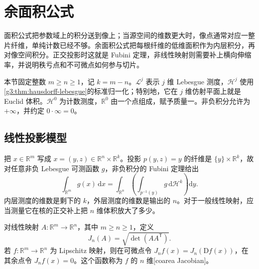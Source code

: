 
% 
% 

\section{余面积公式}
\label{g3:sec:2004}

面积公式把参数域上的积分送到像上；当源空间的维数更大时，像点通常对应一整片纤维，单纯计数已经不够。余面积公式把每根纤维的低维面积作为内层积分，再对像空间积分。正交投影时这就是 Fubini 定理，非线性映射则需要补上横向伸缩率，并说明秩亏点和不可微点如何参与切片。

\ProseParagraphBreak

本节固定整数 \(m\ge n\ge1\)，记 \(k=m-n\)。\(\mathcal L^j\) 表示 \(j\) 维 Lebesgue 测度，\(\mathcal H^j\) 使用\cref{g3:thm:hausdorff-lebesgue}的标准归一化；特别地，它在 \(j\) 维仿射平面上就是 Euclid 体积。\(\mathcal H^0\) 为计数测度，\(\mathbb R^0\) 由一个点组成，赋予质量一。非负积分允许为 \(+\infty\)，并约定 \(0\cdot\infty=0\)。

\subsection{线性投影模型}
\label{g3:subsec:2004:01}
把 \(x\in\mathbb R^m\) 写成 \(x=(y,z)\in\mathbb R^n\times\mathbb R^k\)。投影 \(p(y,z)=y\) 的纤维是 \(\{y\}\times\mathbb R^k\)，故对任意非负 Lebesgue 可测函数 \(g\)，非负积分的 Fubini 定理给出
\[
	\int_{\mathbb R^m}g(x)\,\mathrm dx
	=\int_{\mathbb R^n}\left(\int_{p^{-1}(y)}g\,\mathrm d\mathcal H^k\right)\mathrm dy.
\]
内层测度的维数是剩下的 \(k\)，外层测度的维数是输出的 \(n\)。对于一般线性映射，应当测量它在核的正交补上把 \(n\) 维体积放大了多少。

\begin{definition}\label{g3:def:coarea-jacobian}
	对线性映射 \(A:\mathbb R^m\to\mathbb R^n\)，其中 \(m\ge n\ge1\)，定义
	\[
		J_n(A)=\sqrt{\det(AA^{\mathsf T})}.
	\]
	若 \(f:\mathbb R^m\to\mathbb R^n\) 为 Lipschitz 映射，则在可微点令 \(J_nf(x)=J_n(\mathrm Df(x))\)，在其余点令 \(J_nf(x)=0\)。这个函数称为 \(f\) 的 \(n\) 维[coarea Jacobian]。
\end{definition}

